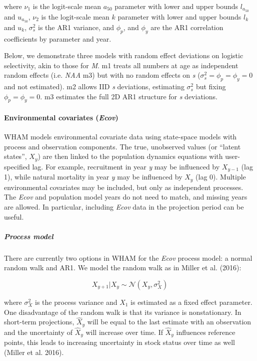 \documentclass[]{article}
\let\oldparagraph\paragraph
\renewcommand{\paragraph}[1]{\oldparagraph{#1}\mbox{}}
\let\oldsubparagraph\subparagraph
\renewcommand{\subparagraph}[1]{\oldsubparagraph{#1}\mbox{}}
\begin{document}
where \(\nu_1\) is the logit-scale mean \(a_{50}\) parameter with lower
and upper bounds \(l_{a_{50}}\) and \(u_{a_{50}}\), \(\nu_2\) is the
logit-scale mean \(k\) parameter with lower and upper bounds \(l_k\) and
\(u_k\), \(\sigma^2_s\) is the AR1 variance, and \(\phi_p\), and
\(\phi_y\) are the AR1 correlation coefficients by parameter and year.

Below, we demonstrate three models with random effect deviations on
logistic selectivity, akin to those for \emph{M}. m1 treats all numbers
at age as independent random effects (i.e. \emph{NAA} m3) but with no
random effects on \emph{s} (\(\sigma^2_s = \phi_p = \phi_y = 0\) and not
estimated). m2 allows IID \emph{s} deviations, estimating \(\sigma^2_s\)
but fixing \(\phi_p = \phi_y = 0\). m3 estimates the full 2D AR1
structure for \emph{s} deviations.

\hypertarget{environmental-covariates-ecov}{%
\paragraph{\texorpdfstring{Environmental covariates
(\emph{Ecov})}{Environmental covariates (Ecov)}}\label{environmental-covariates-ecov}}

WHAM models environmental covariate data using state-space models with
process and observation components. The true, unobserved values (or
``latent states'', \(X_y\)) are then linked to the population dynamics
equations with user-specified lag. For example, recruitment in year
\emph{y} may be influenced by \(X_{y-1}\) (lag 1), while natural
mortality in year \emph{y} may be influenced by \(X_y\) (lag 0).
Multiple environmental covariates may be included, but only as
independent processes. The \emph{Ecov} and population model years do not
need to match, and missing years are allowed. In particular, including
\emph{Ecov} data in the projection period can be useful.

\hypertarget{process-model}{%
\subparagraph{Process model}\label{process-model}}

There are currently two options in WHAM for the \emph{Ecov} process
model: a normal random walk and AR1. We model the random walk as in
Miller et al. (2016):

\[X_{y+1} | X_y \sim \mathcal{N}\left( X_y, \sigma^2_X\right)\]

where \(\sigma^2_X\) is the process variance and \(X_1\) is estimated as
a fixed effect parameter. One disadvantage of the random walk is that
its variance is nonstationary. In short-term projections, \(\hat{X}_y\)
will be equal to the last estimate with an observation and the
uncertainty of \(\hat{X}_y\) will increase over time. If \(\hat{X}_y\)
influences reference points, this leads to increasing uncertainty in
stock status over time as well (Miller et al. 2016).
\end{document}
